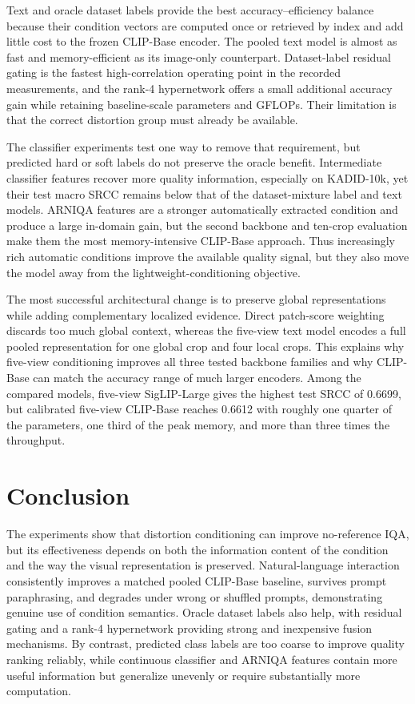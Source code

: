\documentclass{article}
\begin{document}
Text and oracle dataset labels provide the best accuracy--efficiency balance because their condition vectors are computed once or retrieved by index and add little cost to the frozen CLIP-Base encoder. The pooled text model is almost as fast and memory-efficient as its image-only counterpart. Dataset-label residual gating is the fastest high-correlation operating point in the recorded measurements, and the rank-4 hypernetwork offers a small additional accuracy gain while retaining baseline-scale parameters and GFLOPs. Their limitation is that the correct distortion group must already be available.

The classifier experiments test one way to remove that requirement, but predicted hard or soft labels do not preserve the oracle benefit. Intermediate classifier features recover more quality information, especially on KADID-10k, yet their test macro SRCC remains below that of the dataset-mixture label and text models. ARNIQA features are a stronger automatically extracted condition and produce a large in-domain gain, but the second backbone and ten-crop evaluation make them the most memory-intensive CLIP-Base approach. Thus increasingly rich automatic conditions improve the available quality signal, but they also move the model away from the lightweight-conditioning objective.

The most successful architectural change is to preserve global representations while adding complementary localized evidence. Direct patch-score weighting discards too much global context, whereas the five-view text model encodes a full pooled representation for one global crop and four local crops. This explains why five-view conditioning improves all three tested backbone families and why CLIP-Base can match the accuracy range of much larger encoders. Among the compared models, five-view SigLIP-Large gives the highest test SRCC of 0.6699, but calibrated five-view CLIP-Base reaches 0.6612 with roughly one quarter of the parameters, one third of the peak memory, and more than three times the throughput.

\section{Conclusion}

The experiments show that distortion conditioning can improve no-reference IQA, but its effectiveness depends on both the information content of the condition and the way the visual representation is preserved. Natural-language interaction consistently improves a matched pooled CLIP-Base baseline, survives prompt paraphrasing, and degrades under wrong or shuffled prompts, demonstrating genuine use of condition semantics. Oracle dataset labels also help, with residual gating and a rank-4 hypernetwork providing strong and inexpensive fusion mechanisms. By contrast, predicted class labels are too coarse to improve quality ranking reliably, while continuous classifier and ARNIQA features contain more useful information but generalize unevenly or require substantially more computation.
\end{document}

